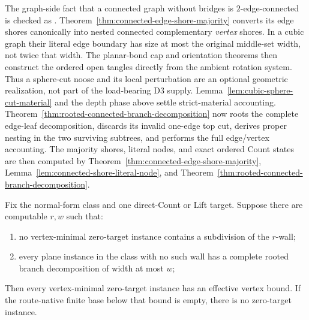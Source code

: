 The graph-side fact that a connected graph without bridges is
\(2\)-edge-connected is checked as
.
Theorem~\ref{thm:connected-edge-shore-majority} converts its edge shores
canonically into nested connected complementary \emph{vertex} shores.  In
a cubic graph their literal edge boundary has size at most the original
middle-set width, not twice that width.  The planar-bond cap and orientation
theorems then construct the ordered open tangles directly from the ambient
rotation system.  Thus a sphere-cut noose and its local perturbation are an
optional geometric realization, not part of the load-bearing D3 supply.
Lemma~\ref{lem:cubic-sphere-cut-material} and the depth phase above settle
strict-material accounting.  Theorem~\ref{thm:rooted-connected-branch-decomposition}
now roots the complete edge-leaf decomposition, discards its invalid
one-edge top cut, derives proper nesting in the two surviving subtrees, and
performs the full edge/vertex accounting.  The majority shores, literal
nodes, and exact ordered Count states are then computed by
Theorem~\ref{thm:connected-edge-shore-majority},
Lemma~\ref{lem:connected-shore-literal-node}, and
Theorem~\ref{thm:rooted-connected-branch-decomposition}.

\begin{proposition}
\label{prop:target-forced-wall}
Fix the normal-form class and one direct-Count or Lift target.  Suppose there
are computable \(r,w\) such that:
\begin{enumerate}
\item no vertex-minimal zero-target instance contains a subdivision of the
\(r\)-wall;
\item every plane instance in the class with no such wall has a complete
rooted branch decomposition of width at most \(w\);
\end{enumerate}
Then every vertex-minimal zero-target instance has an effective vertex
bound.  If the route-native finite base below that bound is empty, there is
no zero-target instance.
\end{proposition}

